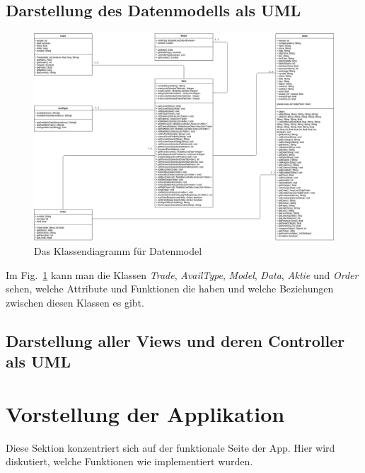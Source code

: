 \documentclass[10pt]{scrartcl}
\begin{document}
\subsection{Darstellung des Datenmodells als UML}
\begin{figure}[H]
	\centering
	\includegraphics[width=1\textwidth]{Bilder/Diagramme/Klassendiagramm.jpg}
	\caption{Das Klassendiagramm für Datenmodel}
	\label{klassendiagramm}
\end{figure}

Im Fig.~\ref{klassendiagramm} kann man die Klassen \textit{Trade}, \textit{AvailType}, \textit{Model}, \textit{Data}, \textit{Aktie} und \textit{Order} sehen, welche Attribute und Funktionen die haben und welche Beziehungen zwischen diesen Klassen es gibt.

\subsection{Darstellung aller Views und deren Controller als UML}

\section{Vorstellung der Applikation}
Diese Sektion konzentriert sich auf der funktionale Seite der App. Hier wird diskutiert, welche Funktionen wie implementiert wurden.
\end{document}
